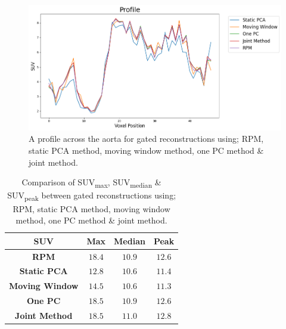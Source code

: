     \begin{figure}
        \vspace{-0.0cm}
        \centering
        \includegraphics[width=0.75\linewidth]{figures/profile_pca.png}
        \captionsetup{singlelinecheck=false, justification=centering}
        \caption{A profile across the aorta for gated reconstructions using; \gls{RPM}, static \gls{PCA} method, moving window method, one \gls{PC} method \& joint method.}
        \label{fig:profile}
        \vspace{-0.5cm}
    \end{figure}
    
    \begin{table}
        \vspace{-0.0cm}
        \centering
        \captionsetup{singlelinecheck=false, justification=centering}
        \caption{Comparison of \gls{SUV}\textsubscript{max}, \gls{SUV}\textsubscript{median} \& \gls{SUV}\textsubscript{peak} between gated reconstructions using; \gls{RPM}, static \gls{PCA} method, moving window method, one \gls{PC} method \& joint method.}
        
        \resizebox*{0.5\linewidth}{!}
        {
            \begin{tabular}{||c|ccc||}
                \hline
                \textbf{\gls{SUV}} & \textbf{Max} & \textbf{Median} & \textbf{Peak} \\
                \hline
                \textbf{\gls{RPM}}          & $18.4$ & $10.9$ & $12.6$ \\
                \hline
                \textbf{Static \gls{PCA}}   & $12.8$ & $10.6$ & $11.4$ \\
                \textbf{Moving Window}      & $14.5$ & $10.6$ & $11.3$ \\
                \textbf{One \gls{PC}}       & $18.5$ & $10.9$ & $12.6$ \\
                \textbf{Joint Method}       & $18.5$ & $11.0$ & $12.8$ \\
                \hline
            \end{tabular}
        }
        \label{tab:suv}
        \vspace{-0.5cm}
    \end{table}
    
